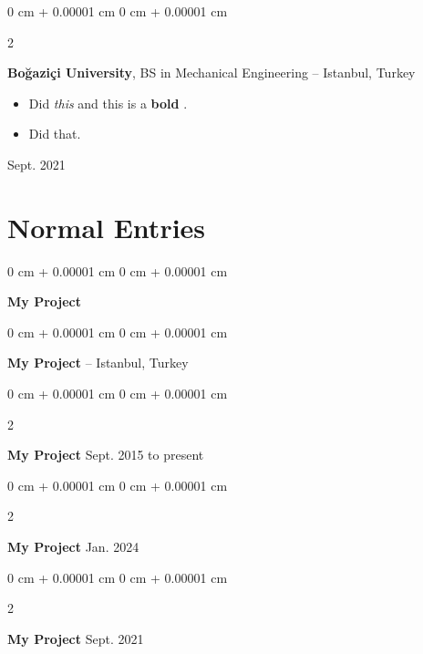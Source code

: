 \documentclass[10pt, letterpaper]{article}
\newenvironment{highlights}{
    \begin{itemize}[
        topsep=0.10 cm,
        parsep=0.10 cm,
        partopsep=0pt,
        itemsep=0pt,
        leftmargin=0 cm + 10pt
    ]
}{
    \end{itemize}
} %
\newenvironment{onecolentry}{
    \begin{adjustwidth}{
        0 cm + 0.00001 cm
    }{
        0 cm + 0.00001 cm
    }
}{
    \end{adjustwidth}
} %
\newenvironment{twocolentry}[2][]{
    \onecolentry
    \def\secondColumn{#2}
    \setcolumnwidth{\fill, 4.2cm}
    \begin{paracol}{2}
}{
    \switchcolumn \raggedleft \secondColumn
    \end{paracol}
    \endonecolentry
} %
\let\hrefWithoutArrow\href
\renewcommand{\href}[2]{\hrefWithoutArrow{#1}{\mbox{\ifthenelse{\equal{#2}{}}{ }{#2 }\raisebox{.15ex}{\footnotesize \faExternalLink*}}}}
\begin{document}
        \vspace{0.1 cm}

        \begin{twocolentry}{
            Sept. 2021
        }
            \textbf{Boğaziçi University}, BS in Mechanical Engineering -- Istanbul, Turkey    \begin{highlights}
                \item Did \textit{this} and this is a \textbf{bold} \href{https://example.com}{link}.
                \item Did that.
            \end{highlights}
        \end{twocolentry}



    
    \section{Normal Entries}

        
        \begin{onecolentry}
            \textbf{My Project}\end{onecolentry}


        \vspace{0.1 cm}

        \begin{onecolentry}
            \textbf{My Project} -- Istanbul, Turkey\end{onecolentry}


        \vspace{0.1 cm}

        \begin{twocolentry}{
            Sept. 2015 to present
        }
            \textbf{My Project}\end{twocolentry}


        \vspace{0.1 cm}

        \begin{twocolentry}{
            Jan. 2024
        }
            \textbf{My Project}\end{twocolentry}


        \vspace{0.1 cm}

        \begin{twocolentry}{
            Sept. 2021
        }
            \textbf{My Project}\end{twocolentry}


        \vspace{0.1 cm}
\end{document}

